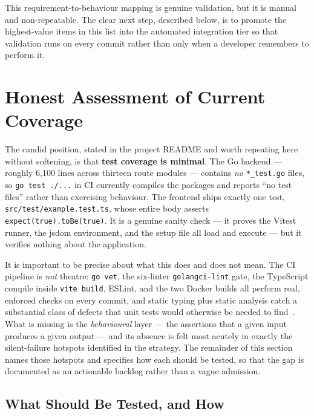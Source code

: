 This requirement-to-behaviour mapping is genuine validation, but it is
manual and non-repeatable. The clear next step, described below, is to
promote the highest-value items in this list into the automated
integration tier so that validation runs on every commit rather than
only when a developer remembers to perform it.

\section{Honest Assessment of Current Coverage}\label{sec:coverage}

The candid position, stated in the project README and worth repeating
here without softening, is that \textbf{test coverage is minimal}. The
Go backend --- roughly 6{,}100 lines across thirteen route modules ---
contains \emph{no} \texttt{*\_test.go} files, so \texttt{go test ./...}
in CI currently compiles the packages and reports ``no test files''
rather than exercising behaviour. The frontend ships exactly one test,
\texttt{src/test/example.test.ts}, whose entire body asserts
\texttt{expect(true).toBe(true)}. It is a genuine sanity check --- it
proves the Vitest runner, the jsdom environment, and the setup file all
load and execute --- but it verifies nothing about the application.

It is important to be precise about what this does and does not mean.
The CI pipeline is \emph{not} theatre: \texttt{go vet}, the six-linter
\texttt{golangci-lint} gate, the TypeScript compile inside
\texttt{vite build}, ESLint, and the two Docker builds all perform real,
enforced checks on every commit, and static typing plus static analysis
catch a substantial class of defects that unit tests would otherwise be
needed to find~\cite{pressman-se}. What is missing is the
\emph{behavioural} layer --- the assertions that a given input produces a
given output --- and its absence is felt most acutely in exactly the
silent-failure hotspots identified in the strategy. The remainder of this
section names those hotspots and specifies how each should be tested,
so that the gap is documented as an actionable backlog rather than a
vague admission.

\subsection{What Should Be Tested, and How}

